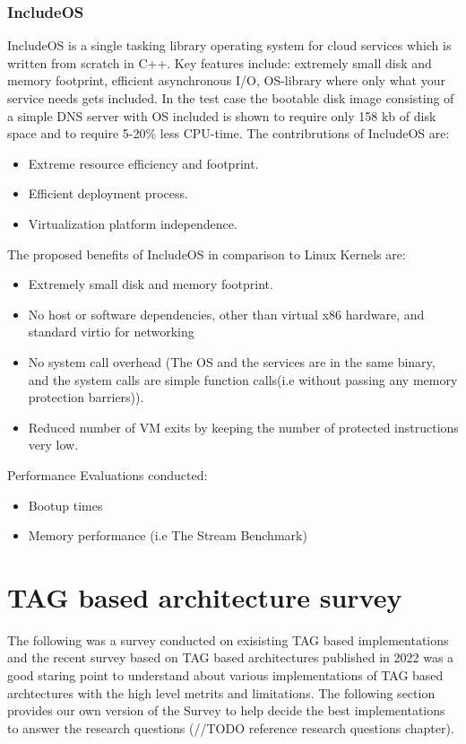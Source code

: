 \subsubsection{IncludeOS}
IncludeOS is a single tasking library operating system for 
cloud services which is written from scratch in C++. Key features include:
extremely small disk and memory footprint, efficient asynchronous I/O, 
OS-library where only what your service needs gets included.
In the test case the bootable disk image consisting
of a simple DNS server with OS included is shown
to require only 158 kb of disk space and to require
5-20\% less CPU-time.
The contribrutions of IncludeOS are:
\begin{itemize}
  \item Extreme resource efficiency and footprint.
  \item Efficient deployment process.
  \item Virtualization platform independence.
\end{itemize}
The proposed benefits of IncludeOS  in comparison to Linux Kernels are:
\begin{itemize}
  \item Extremely small disk and memory footprint.
  \item No host or software dependencies, other than
  virtual x86 hardware, and standard virtio for
  networking
  \item No system call overhead (The OS and the
  services are in the same binary, and the system calls
  are simple function calls(i.e without passing any
  memory protection barriers)).
  \item Reduced number of VM exits by keeping the
  number of protected instructions very low.
\end{itemize}

Performance Evaluations conducted:
\begin{itemize}
  \item Bootup times 
  \item Memory performance (i.e The Stream Benchmark)
\end{itemize}











\section[TAG based architecture survey]{TAG based architecture survey}   
The following was a survey conducted on exisisting TAG based implementations and the 
recent survey based on TAG based architectures \cite{acmTAGSurvey} published
in 2022 was a good staring point to understand about various implementations of TAG
based archtectures with the high level metrits and limitations. The following section 
provides our own version of the Survey to help decide the best implementations 
to answer the research questions (//TODO reference research questions chapter).

